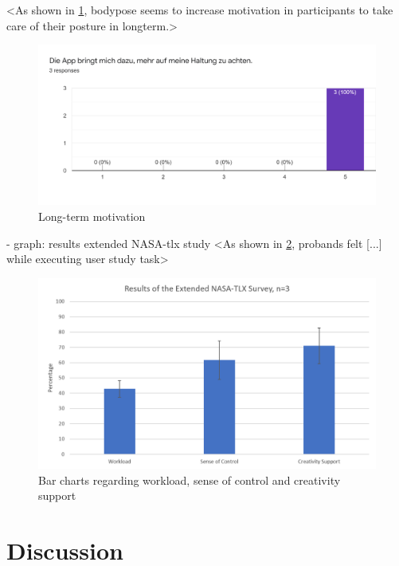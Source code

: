 <As shown in \ref{fig:us-gs-longterm}, bodypose seems to increase motivation in participants to take care of their posture in longterm.>

\begin{figure}[hbp]
\centering
\includegraphics[width=\linewidth]{media/us-gs-longterm-motivation-results.png}    
\caption{Long-term motivation}
\label{fig:us-gs-longterm}
\end{figure}


- graph: results extended NASA-tlx study
<As shown in \ref{fig:ext-nasa-results}, probands felt [...] while executing user study task>

\begin{figure}[hbp]
\centering
\includegraphics[width=\linewidth]{media/us-ext-nasa-tlx-results.png}    
\caption{Bar charts regarding workload, sense of control and creativity support}
    \label{fig:ext-nasa-results}
\end{figure}

\section{Discussion} %
\label{discussion-future-work}


